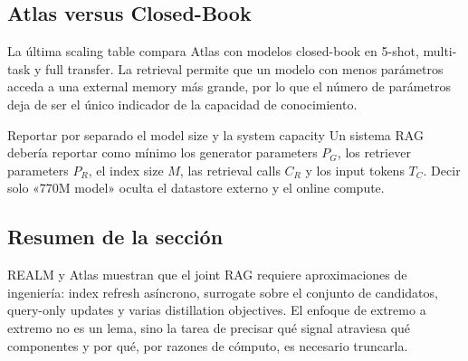 
\subsection{Atlas versus Closed-Book}

La última scaling table compara Atlas con modelos closed-book en 5-shot, multi-task y full transfer. La retrieval permite que un modelo con menos parámetros acceda a una external memory más grande, por lo que el número de parámetros deja de ser el único indicador de la capacidad de conocimiento.


\begin{importantbox}{Reportar por separado el model size y la system capacity}
Un sistema RAG debería reportar como mínimo los generator parameters $P_G$, los retriever parameters $P_R$, el index size $M$, las retrieval calls $C_R$ y los input tokens $T_C$. Decir solo «770M model» oculta el datastore externo y el online compute.
\end{importantbox}

\subsection{Resumen de la sección}

REALM y Atlas muestran que el joint RAG requiere aproximaciones de ingeniería: index refresh asíncrono, surrogate sobre el conjunto de candidatos, query-only updates y varias distillation objectives. El enfoque de extremo a extremo no es un lema, sino la tarea de precisar qué signal atraviesa qué componentes y por qué, por razones de cómputo, es necesario truncarla.

